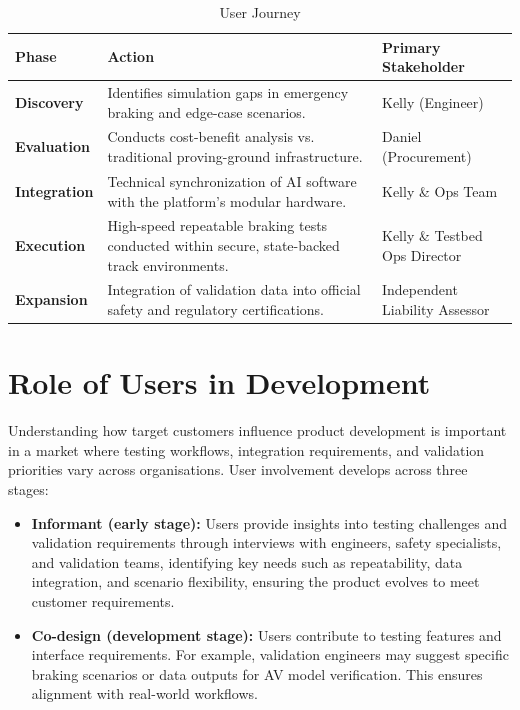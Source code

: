 \documentclass[11pt, a4paper]{report}
\numberwithin{equation}{section}
\begin{document}
\begin{refsection}
\begin{table}[h!]
\centering
\caption{User Journey}
\label{tab:user_journey}
\begin{tabularx}{\textwidth}{|l|X|l|}
\hline
\textbf{Phase} & \textbf{Action} & \textbf{Primary Stakeholder} \\ \hline
\textbf{Discovery} & Identifies simulation gaps in emergency braking and edge-case scenarios. & Kelly (Engineer) \\ \hline
\textbf{Evaluation} & Conducts cost-benefit analysis vs. traditional proving-ground infrastructure. & Daniel (Procurement) \\ \hline
\textbf{Integration} & Technical synchronization of AI software with the platform's modular hardware. & Kelly \& Ops Team \\ \hline
\textbf{Execution} & High-speed repeatable braking tests conducted within secure, state-backed track environments. & Kelly \& Testbed Ops Director \\ \hline
\textbf{Expansion} & Integration of validation data into official safety and regulatory certifications. & Independent Liability Assessor \\ \hline
\end{tabularx}
\end{table}
\vspace{-8pt}
\section{Role of Users in Development}
\label{sec:ch6-role-of-users}
Understanding how target customers influence product development is important in a market where testing workflows, integration requirements, and validation priorities vary across organisations. User involvement develops across three stages:

\begin{itemize}

    \item \textbf{Informant (early stage):} Users provide insights into testing challenges and validation requirements through interviews with engineers, safety specialists, and validation teams, identifying key needs such as repeatability, data integration, and scenario flexibility, ensuring the product evolves to meet customer requirements.

    \item \textbf{Co-design (development stage):} Users contribute to testing features and interface requirements. For example, validation engineers may suggest specific braking scenarios or data outputs for AV model verification. This ensures alignment with real-world workflows.


\end{itemize}
\end{refsection}
\end{document}
